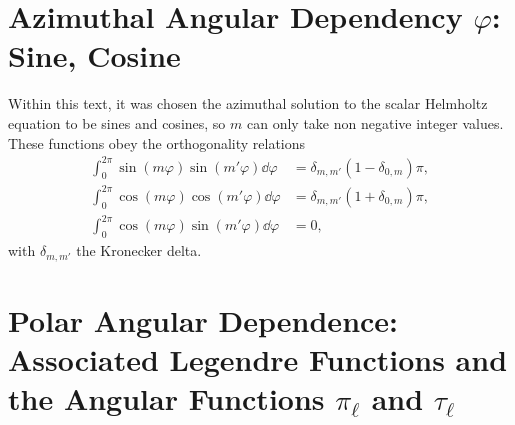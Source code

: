 \section*{Azimuthal Angular Dependency $\varphi$: Sine, Cosine}

Within this text, it was chosen the azimuthal solution to the scalar Helmholtz equation to be sines and cosines, so $m$ can only take non negative integer values. These functions obey the orthogonality relations
%
\begin{align}
\int_0^{2\pi} \sin(m\varphi)\sin(m'\varphi) \dd{\varphi} &= \delta_{m,m'}( 1 - \delta_{0,m}) \pi,
\label{eq:SinOrth}\\
\int_0^{2\pi} \cos(m\varphi)\cos(m'\varphi) \dd{\varphi} & =\delta_{m,m'}( 1+ \delta_{0,m}) \pi,
\label{eq:CosOrth}\\
\int_0^{2\pi} \cos(m\varphi)\sin(m'\varphi) \dd{\varphi} &=0,
\label{eq:SinCosOrth}
\end{align}
%
with $\delta_{m,m'}$ the Kronecker delta.

\section*{Polar Angular Dependence: Associated Legendre Functions and the Angular Functions $\pi_\ell$ and $\tau_\ell$}

